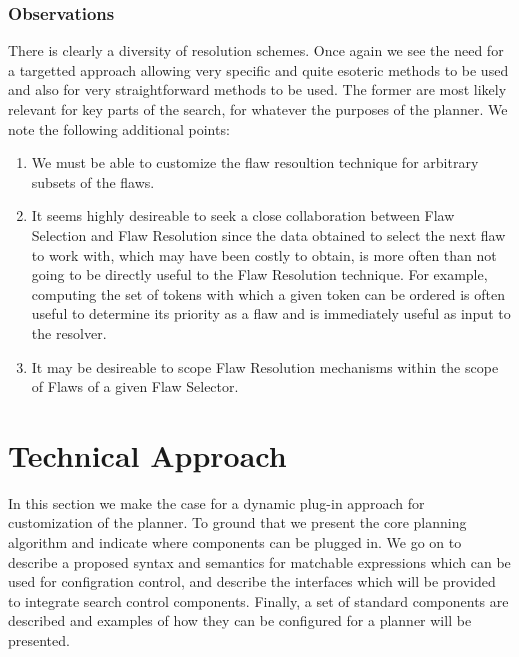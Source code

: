 \documentclass[10pt, letterpaper, oneside]{article}
\begin{document}
\subsubsection{Observations}
There is clearly a diversity of resolution schemes. Once again we see the need for a targetted approach allowing very specific and quite esoteric methods to be used and also for very straightforward methods to be used. The former are most likely relevant for key parts of the search, for whatever the purposes of the planner. We note the following additional points:
\begin{enumerate}
\item We must be able to customize the flaw resoultion technique for arbitrary subsets of the flaws.
\item It seems highly desireable to seek a close collaboration between Flaw Selection and Flaw Resolution since the data obtained to select the next flaw to work with, which may have been costly to obtain, is more often than not going to be directly useful to the Flaw Resolution technique. For example, computing the set of tokens with which a given token can be ordered is often useful to determine its priority as a flaw and is immediately useful as input to the resolver. 
\item It may be desireable to scope Flaw Resolution mechanisms within the scope of Flaws of a given Flaw Selector.
\end{enumerate}


\section{Technical Approach}
In this section we make the case for a dynamic plug-in approach for customization of the planner. To ground that we present the core planning algorithm and indicate where components can be plugged in. We go on to describe a proposed syntax and semantics for matchable expressions which can be used for configration control, and describe the interfaces which will be provided to integrate search control components. Finally, a set of standard components are described and examples of how they can be configured for a planner will be presented.
\end{document}

